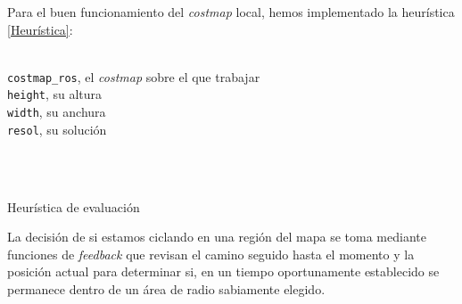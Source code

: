\documentclass[a4paper, 11pt]{article}
\begin{document}
	Para el buen funcionamiento del \textit{costmap} local, hemos implementado la heurística \ref{Heurística}:
	
	\begin{algorithm}[H]
		\begin{algorithmic}[1]

			\REQUIRE \ \\
	        	\texttt{costmap\_ros}, el \textit{costmap} sobre el que trabajar\\
	        	\texttt{height}, su altura\\
	        	\texttt{width}, su anchura\\
	        	\texttt{resol}, su solución\\ \

	     	\\
				\ENDIF
			\ENDFOR
				  		
		\end{algorithmic}
		\caption{Heurística de evaluación}
		\label{Heurística}
	\end{algorithm}

	La decisión de si estamos ciclando en una región del mapa se toma mediante funciones de \textit{feedback}
	que revisan el camino seguido hasta el momento y la posición actual para determinar si, en un tiempo
	oportunamente establecido se permanece dentro de un área de radio sabiamente elegido.
	
\end{document}
